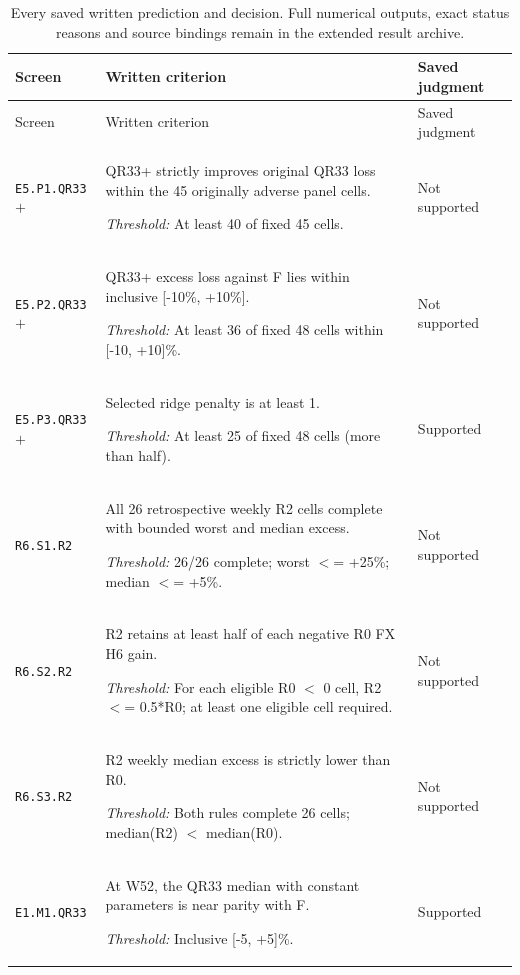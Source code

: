 \documentclass[10pt,a4paper]{article}
\begin{document}
{\footnotesize
\begin{longtable}{p{2.0cm}p{10.5cm}p{2.5cm}}
\caption{Every saved written prediction and decision. Full numerical outputs, exact status reasons and source bindings remain in the extended result archive.}\label{tab:submission-predictions}\\
\toprule Screen & Written criterion & Saved judgment\\\midrule\endfirsthead
\toprule Screen & Written criterion & Saved judgment\\\midrule\endhead
\texttt{E5.\allowbreak{}P1.\allowbreak{}QR33\ensuremath{+}} & QR33+ strictly improves original QR33 loss within the 45 originally adverse panel cells.\par\emph{Threshold:} At least 40 of fixed 45 cells. & Not supported \\[3pt]
\texttt{E5.\allowbreak{}P2.\allowbreak{}QR33\ensuremath{+}} & QR33+ excess loss against F lies within inclusive [-10\%,\allowbreak{} +10\%].\par\emph{Threshold:} At least 36 of fixed 48 cells within [-10,\allowbreak{} +10]\%. & Not supported \\[3pt]
\texttt{E5.\allowbreak{}P3.\allowbreak{}QR33\ensuremath{+}} & Selected ridge penalty is at least 1.\par\emph{Threshold:} At least 25 of fixed 48 cells (more than half). & Supported \\[3pt]
\texttt{R6.\allowbreak{}S1.\allowbreak{}R2} & All 26 retrospective weekly R2 cells complete with bounded worst and median excess.\par\emph{Threshold:} 26/\allowbreak{}26 complete; worst \ensuremath{<}=\allowbreak{} +25\%; median \ensuremath{<}=\allowbreak{} +5\%. & Not supported \\[3pt]
\texttt{R6.\allowbreak{}S2.\allowbreak{}R2} & R2 retains at least half of each negative R0 FX H6 gain.\par\emph{Threshold:} For each eligible R0 \ensuremath{<} 0 cell,\allowbreak{} R2 \ensuremath{<}=\allowbreak{} 0.5*R0; at least one eligible cell required. & Not supported \\[3pt]
\texttt{R6.\allowbreak{}S3.\allowbreak{}R2} & R2 weekly median excess is strictly lower than R0.\par\emph{Threshold:} Both rules complete 26 cells; median(R2) \ensuremath{<} median(R0). & Not supported \\[3pt]
\texttt{E1.\allowbreak{}M1.\allowbreak{}QR33} & At W52, the QR33 median with constant parameters is near parity with F.\par\emph{Threshold:} Inclusive [-5,\allowbreak{} +5]\%. & Supported \\[3pt]

\end{longtable}}
\end{document}
